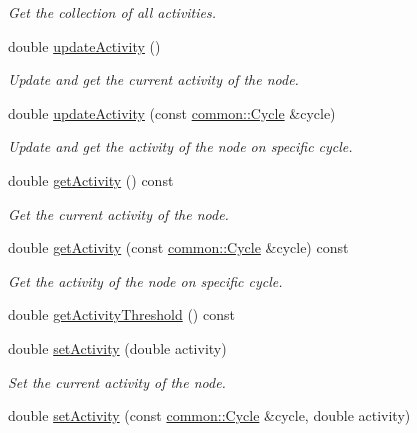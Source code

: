 \begin{DoxyCompactItemize}
\begin{DoxyCompactList}\small\item\em \-Get the collection of all activities. \end{DoxyCompactList}\item 
double \hyperlink{classcryomesh_1_1components_1_1Node_ab9f3406d26f50f3dcee4b19c30cfc893}{update\-Activity} ()
\begin{DoxyCompactList}\small\item\em \-Update and get the current activity of the node. \end{DoxyCompactList}\item 
double \hyperlink{classcryomesh_1_1components_1_1Node_a2074cbfe458cda6fc10997ae6965f168}{update\-Activity} (const \hyperlink{classcryomesh_1_1common_1_1Cycle}{common\-::\-Cycle} \&cycle)
\begin{DoxyCompactList}\small\item\em \-Update and get the activity of the node on specific cycle. \end{DoxyCompactList}\item 
double \hyperlink{classcryomesh_1_1components_1_1Node_a355e414f9a353883fd0f4b7cae24d6cc}{get\-Activity} () const 
\begin{DoxyCompactList}\small\item\em \-Get the current activity of the node. \end{DoxyCompactList}\item 
double \hyperlink{classcryomesh_1_1components_1_1Node_a07c29936e9a695e32365708f8c381456}{get\-Activity} (const \hyperlink{classcryomesh_1_1common_1_1Cycle}{common\-::\-Cycle} \&cycle) const 
\begin{DoxyCompactList}\small\item\em \-Get the activity of the node on specific cycle. \end{DoxyCompactList}\item 
double \hyperlink{classcryomesh_1_1components_1_1Node_ab561d1b0b10339ad8ae2280a8063677b}{get\-Activity\-Threshold} () const 
\item 
double \hyperlink{classcryomesh_1_1components_1_1Node_acf3b0de410fee4350390bd527c544187}{set\-Activity} (double activity)
\begin{DoxyCompactList}\small\item\em \-Set the current activity of the node. \end{DoxyCompactList}\item 
double \hyperlink{classcryomesh_1_1components_1_1Node_aacac1b5adbafe83a7dcae288a607ee31}{set\-Activity} (const \hyperlink{classcryomesh_1_1common_1_1Cycle}{common\-::\-Cycle} \&cycle, double activity)

\end{DoxyCompactItemize}
